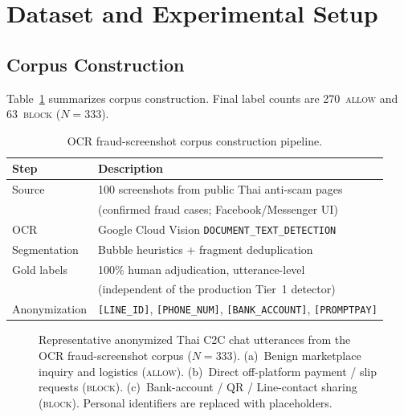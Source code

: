 \documentclass[conference]{IEEEtran}
\begin{document}
\section{Dataset and Experimental Setup}

\subsection{Corpus Construction}
Table~\ref{tab:corpus-pipeline} summarizes corpus construction. Final label
counts are 270~\textsc{allow} and 63~\textsc{block} ($N{=}333$).

\begin{table}[t]
\centering
\caption{OCR fraud-screenshot corpus construction pipeline.}
\label{tab:corpus-pipeline}
\begin{tabular}{@{}ll@{}}
\toprule
\textbf{Step} & \textbf{Description} \\
\midrule
Source & 100 screenshots from public Thai anti-scam pages \\
 & (confirmed fraud cases; Facebook/Messenger UI) \\
OCR & Google Cloud Vision \texttt{DOCUMENT\_TEXT\_DETECTION} \\
Segmentation & Bubble heuristics + fragment deduplication \\
Gold labels & 100\% human adjudication, utterance-level \\
 & (independent of the production Tier~1 detector) \\
Anonymization & \texttt{[LINE\_ID]}, \texttt{[PHONE\_NUM]}, \texttt{[BANK\_ACCOUNT]}, \texttt{[PROMPTPAY]} \\
\bottomrule
\end{tabular}
\end{table}

\begin{figure}[t]
\centering
{}
\caption{Representative anonymized Thai C2C chat utterances from the OCR
fraud-screenshot corpus ($N{=}333$). (a)~Benign marketplace inquiry and
logistics (\textsc{allow}). (b)~Direct off-platform payment / slip requests
(\textsc{block}). (c)~Bank-account / QR / Line-contact sharing
(\textsc{block}). Personal identifiers are replaced with placeholders.}
\label{fig:examples}
\end{figure}
\end{document}
